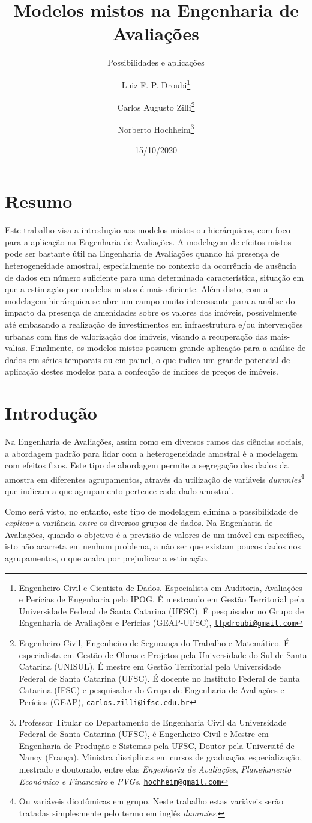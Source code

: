 \documentclass[
  a4paper, 11pt]{article}
\title{Modelos mistos na Engenharia de Avaliações}
\subtitle{Possibilidades e aplicações}
\author{Luiz F. P. Droubi\footnote{Engenheiro Civil e Cientista de Dados.
  Especialista em Auditoria, Avaliações e Perícias de Engenharia pelo
  IPOG. É mestrando em Gestão Territorial pela Universidade Federal de
  Santa Catarina (UFSC). É pesquisador no Grupo de Engenharia de
  Avaliações e Perícias (GEAP-UFSC),
  \href{mailto:lfpdroubi@gmail.com}{\nolinkurl{lfpdroubi@gmail.com}}} \and Carlos Augusto Zilli\footnote{Engenheiro Civil, Engenheiro de Segurança
  do Trabalho e Matemático. É especialista em Gestão de Obras e Projetos
  pela Universidade do Sul de Santa Catarina (UNISUL). É mestre em
  Gestão Territorial pela Universidade Federal de Santa Catarina (UFSC).
  É docente no Instituto Federal de Santa Catarina (IFSC) e pesquisador
  do Grupo de Engenharia de Avaliações e Perícias (GEAP),
  \href{mailto:carlos.zilli@ifsc.edu.br}{\nolinkurl{carlos.zilli@ifsc.edu.br}}} \and Norberto Hochheim\footnote{Professor Titular do Departamento de
  Engenharia Civil da Universidade Federal de Santa Catarina (UFSC), é
  Engenheiro Civil e Mestre em Engenharia de Produção e Sistemas pela
  UFSC, Doutor pela Université de Nancy (França). Ministra disciplinas
  em cursos de graduação, especialização, mestrado e doutorado, entre
  elas \emph{Engenharia de Avaliações}, \emph{Planejamento Econômico e
  Financeiro} e \emph{PVGs},
  \href{mailto:hochheim@gmail.com}{\nolinkurl{hochheim@gmail.com}}}}
\date{15/10/2020}
\begin{document}
\maketitle

\hypertarget{resumo}{%
\section*{Resumo}\label{resumo}}

Este trabalho visa a introdução aos modelos mistos ou hierárquicos, com
foco para a aplicação na Engenharia de Avaliações. A modelagem de
efeitos mistos pode ser bastante útil na Engenharia de Avaliações quando
há presença de heterogeneidade amostral, especialmente no contexto da
ocorrência de ausência de dados em número suficiente para uma
determinada característica, situação em que a estimação por modelos
mistos é mais eficiente. Além disto, com a modelagem hierárquica se abre
um campo muito interessante para a análise do impacto da presença de
amenidades sobre os valores dos imóveis, possivelmente até embasando a
realização de investimentos em infraestrutura e/ou intervenções urbanas
com fins de valorização dos imóveis, visando a recuperação das
mais-valias. Finalmente, os modelos mistos possuem grande aplicação para
a análise de dados em séries temporais ou em painel, o que indica um
grande potencial de aplicação destes modelos para a confecção de índices
de preços de imóveis.

\hypertarget{introduuxe7uxe3o}{%
\section{Introdução}\label{introduuxe7uxe3o}}

Na Engenharia de Avaliações, assim como em diversos ramos das ciências
sociais, a abordagem padrão para lidar com a heterogeneidade amostral é
a modelagem com efeitos fixos. Este tipo de abordagem permite a
segregação dos dados da amostra em diferentes agrupamentos, através da
utilização de variáveis \emph{dummies}\footnote{Ou variáveis dicotômicas
  em grupo. Neste trabalho estas variáveis serão tratadas simplesmente
  pelo termo em inglês \emph{dummies}.} que indicam a que agrupamento
pertence cada dado amostral.

Como será visto, no entanto, este tipo de modelagem elimina a
possibilidade de \emph{explicar} a variância \emph{entre} os diversos
grupos de dados. Na Engenharia de Avaliações, quando o objetivo é a
previsão de valores de um imóvel em específico, isto não acarreta em
nenhum problema, a não ser que existam poucos dados nos agrupamentos, o
que acaba por prejudicar a estimação.
\end{document}
